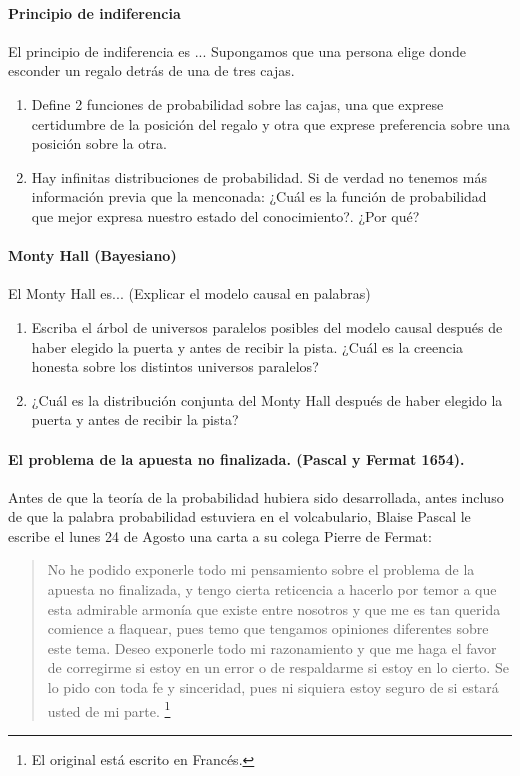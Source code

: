 \documentclass[a4paper,10pt]{article}
\begin{document}
\paragraph{Principio de indiferencia} El principio de indiferencia es ...  Supongamos que una persona elige donde esconder un regalo detrás de una de tres cajas.

\begin{enumerate}
\item Define 2 funciones de probabilidad sobre las cajas, una que exprese certidumbre de la posición del regalo y otra que exprese preferencia sobre una posición sobre la otra.
\item Hay infinitas distribuciones de probabilidad. Si de verdad no tenemos más información previa que la menconada: ¿Cuál es la función de probabilidad que mejor expresa nuestro estado del conocimiento?. ¿Por qué?
\end{enumerate}


\paragraph{Monty Hall (Bayesiano)} El Monty Hall es... (Explicar el modelo causal en palabras)

\begin{enumerate}[resume]
\item Escriba el árbol de universos paralelos posibles del modelo causal después de haber elegido la puerta y antes de recibir la pista. ¿Cuál es la creencia honesta sobre los distintos universos paralelos?
\item ¿Cuál es la distribución conjunta del Monty Hall después de haber elegido la puerta y antes de recibir la pista?
\end{enumerate}

\paragraph{El problema de la apuesta no finalizada. (Pascal y Fermat 1654).}

Antes de que la teoría de la probabilidad hubiera sido desarrollada, antes incluso de que la palabra probabilidad estuviera en el volcabulario, Blaise Pascal le escribe el lunes 24 de Agosto una carta a su colega Pierre de Fermat:

\begin{quotation}
No he podido exponerle todo mi pensamiento sobre el problema de la apuesta no finalizada, y tengo cierta reticencia a hacerlo por temor a que esta admirable armonía que existe entre nosotros y que me es tan querida comience a flaquear, pues temo que tengamos opiniones diferentes sobre este tema.
Deseo exponerle todo mi razonamiento y que me haga el favor de corregirme si estoy en un error o de respaldarme si estoy en lo cierto.
Se lo pido con toda fe y sinceridad, pues ni siquiera estoy seguro de si estará usted de mi parte.
\footnote{El original está escrito en Francés.}
\end{quotation}
\end{document}
